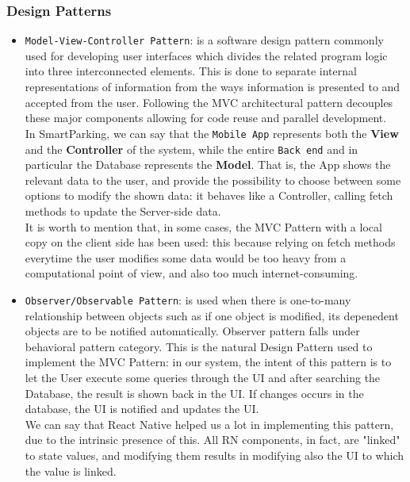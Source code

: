\documentclass[11pt]{article} %
\begin{document}
\subsubsection{Design Patterns}
\begin{itemize}
\item \texttt{Model-View-Controller Pattern}: is a software design pattern commonly used for developing user interfaces which divides the related program logic into three interconnected elements. This is done to separate internal representations of information from the ways information is presented to and accepted from the user. Following the MVC architectural pattern decouples these major components allowing for code reuse and parallel development. \\In SmartParking, we can say that the \texttt{Mobile App} represents both the \textbf{View} and the \textbf{Controller} of the system, while the entire \texttt{Back end} and in particular the Database represents the \textbf{Model}. That is, the App shows the relevant data to the user, and provide the possibility to choose between some options to modify the shown data: it behaves like a Controller, calling fetch methods to update the Server-side data. \\It is worth to mention that, in some cases, the MVC Pattern with a local copy on the client side has been used: this because relying on fetch methods everytime the user modifies some data would be too heavy from a computational point of view, and also too much internet-consuming.  

\item \texttt{Observer/Observable Pattern}: is used when there is one-to-many relationship between objects such as if one object is modified, its depenedent objects are to be notified automatically. Observer pattern falls under behavioral pattern category. This is the natural Design Pattern used to implement the MVC Pattern: in our system, the intent of this pattern is to let the User execute some queries through the UI and after searching the Database, the result is shown back in the UI. If changes occurs in the database, the UI is notified and updates the UI. \\We can say that React Native helped us a lot in implementing this pattern, due to the intrinsic presence of this. All RN components, in fact, are "linked" to state values, and modifying them results in modifying also the UI to which the value is linked. 
\end{itemize}
\end{document}
